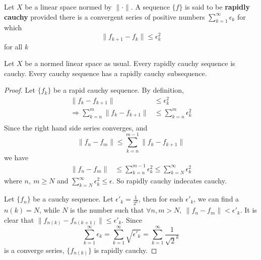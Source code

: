 \documentclass[lang=en, 12pt]{elegantbook}
\begin{document}
        \begin{definition}
            Let $X$ be a linear space normed by $\lVert \cdot \rVert$. A sequence $\{f\}$
        is said to be \textbf{rapidly cauchy} provided there is a convergent series 
        of positive numbers $\sum_{k=1}^{\infty} \epsilon_k$ for which 
        $$\lVert f_{k+1} - f_{k} \rVert \leq \epsilon_k^2$$
        for all $k$
        \end{definition}
        \begin{proposition}\label{RapidlyCauchy}
            Let $X$ be a normed linear space as usual. Every rapidly cauchy sequence 
        is cauchy. Every cauchy sequence has a rapidly cauchy subsequence. 
        \end{proposition}
        \begin{proof}
            Let $\{f_k\}$ be a rapid cauchy sequence.
            By definition, 
            \begin{equation*}
                \begin{aligned}
                    \lVert f_k - f_{k+1} \rVert &\leq \epsilon_k^2\\
                    \Rightarrow \sum_{k=n}^{m}\lVert f_k - f_{k+1} \rVert &\leq \sum_{k=n}^{m} \epsilon_k^2\\
                \end{aligned}
            \end{equation*}
            Since the right hand side series converges, and 
            $$\lVert f_n - f_m \rVert \leq \sum_{k=n}^{m-1}\lVert f_k - f_{k+1} \rVert$$
            we have 
            \begin{equation*}
                \begin{aligned}
                    \lVert f_n - f_m \rVert &\leq \sum_{k=n}^{m-1} \epsilon_k^2
                    \leq \sum_{k=N}^{\infty} \epsilon_k^2    
                \end{aligned}
            \end{equation*}
            where $n , \ m \geq N$ and $\sum_{k=N}^{\infty} \epsilon_k^2 \leq \epsilon$.
            So rapidly cauchy indecates cauchy.\par 
            Let $\{f_n\}$ be a cauchy sequence. Let $\epsilon'_k = \frac{1}{2^k}$, then
        for each $\epsilon'_k$, we can find a $n(k) = N$, while $N$ is the number such that 
        $\forall n,m >N, \ \lVert f_n -f_m \rVert < \epsilon'_k$. It is clear that 
        $\lVert f_{n(k)} - f_{n(k+1)} \rVert \leq \epsilon'_k$. Since 
        $$\sum_{k=1}^{\infty}\epsilon_k = \sum_{k=1}^{\infty} \sqrt{\epsilon'_k} 
        = \sum_{k=1}^{\infty}\frac{1}{\sqrt{2}^k}$$
        is a converge series, $\{f_{n(k)}\}$ is rapidly cauchy.
        \end{proof}
\end{document}
